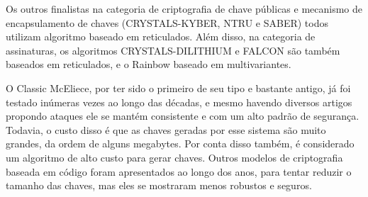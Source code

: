 Os outros finalistas na categoria de criptografia de chave públicas e mecanismo de encapsulamento de chaves (CRYSTALS-KYBER, NTRU e SABER) todos utilizam algoritmo baseado em reticulados. Além disso, na categoria de assinaturas, os algoritmos CRYSTALS-DILITHIUM e FALCON são também baseados em reticulados, e o Rainbow baseado em multivariantes. 

O Classic McEliece, por ter sido o primeiro de seu tipo e bastante antigo, já foi testado inúmeras vezes ao longo das décadas, e mesmo havendo diversos artigos propondo ataques ele se mantém consistente e com um alto padrão de segurança. Todavia, o custo disso é que as chaves geradas por esse sistema são muito grandes, da ordem de alguns megabytes. Por conta disso também, é considerado um algoritmo de alto custo para gerar chaves. Outros modelos de criptografia baseada em código foram apresentados ao longo dos anos, para tentar reduzir o tamanho das chaves, mas eles se mostraram menos robustos e seguros.

